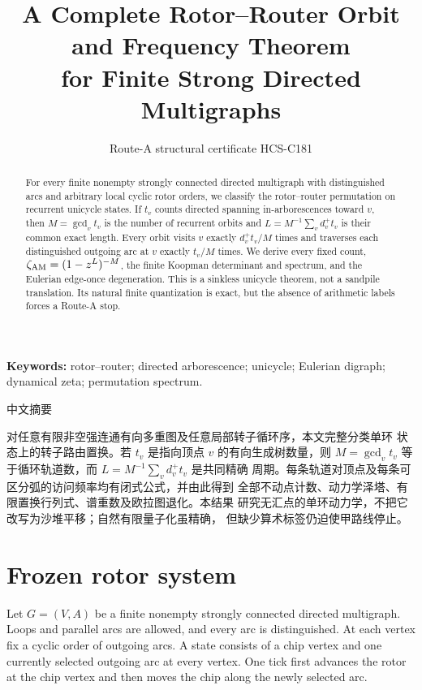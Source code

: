 \documentclass[10pt]{article}
\title{\vspace{-1.5em}A Complete Rotor--Router Orbit and Frequency Theorem\\for Finite Strong Directed Multigraphs}
\author{Route-A structural certificate HCS-C181}
\date{}
\begin{document}
\maketitle
\begin{abstract}
For every finite nonempty strongly connected directed multigraph with
distinguished arcs and arbitrary local cyclic rotor orders, we classify the
rotor--router permutation on recurrent unicycle states.  If $t_v$ counts
directed spanning in-arborescences toward $v$, then
$M=\gcd_vt_v$ is the number of recurrent orbits and
$L=M^{-1}\sum_vd_v^+t_v$ is their common exact length.  Every orbit visits
$v$ exactly $d_v^+t_v/M$ times and traverses each distinguished outgoing arc
at $v$ exactly $t_v/M$ times.  We derive every fixed count,
$\zeta_{\rm AM}=(1-z^L)^{-M}$, the finite Koopman determinant and spectrum,
and the Eulerian edge-once degeneration.  This is a sinkless unicycle theorem,
not a sandpile translation.  Its natural finite quantization is exact, but the
absence of arithmetic labels forces a Route-A stop.
\end{abstract}
\noindent\textbf{Keywords:} rotor--router; directed arborescence; unicycle;
Eulerian digraph; dynamical zeta; permutation spectrum.

\begin{otherlanguage}{chinese-simplified}
\begin{center}{\large 中文摘要}\end{center}
对任意有限非空强连通有向多重图及任意局部转子循环序，本文完整分类单环
状态上的转子路由置换。若 $t_v$ 是指向顶点 $v$ 的有向生成树数量，则
$M=\gcd_vt_v$ 等于循环轨道数，而 $L=M^{-1}\sum_vd_v^+t_v$ 是共同精确
周期。每条轨道对顶点及每条可区分弧的访问频率均有闭式公式，并由此得到
全部不动点计数、动力学泽塔、有限置换行列式、谱重数及欧拉图退化。本结果
研究无汇点的单环动力学，不把它改写为沙堆平移；自然有限量子化虽精确，
但缺少算术标签仍迫使甲路线停止。
\end{otherlanguage}

\section{Frozen rotor system}
Let $G=(V,A)$ be a finite nonempty strongly connected directed multigraph.
Loops and parallel arcs are allowed, and every arc is distinguished.  At each
vertex fix a cyclic order of outgoing arcs.  A state consists of a chip vertex
and one currently selected outgoing arc at every vertex.  One tick first
advances the rotor at the chip vertex and then moves the chip along the newly
selected arc.
\end{document}
